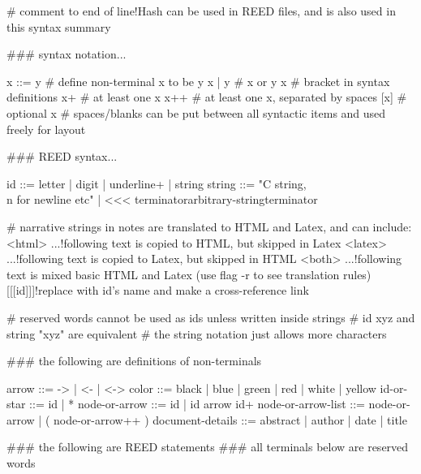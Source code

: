 # comment to end of line!Hash can be used in REED files, and is also used in this syntax summary

### syntax notation...

x ::= y # define non-terminal x to be y
x | y   # x or y
{x}     # bracket in syntax definitions
x+      # at least one x
x++     # at least one x, separated by spaces
[x]     # optional x
        # spaces/blanks can be put between all syntactic items and used freely for layout 

### REED syntax...

id ::= {letter | digit | underline}+ | string
string ::= "C string, \\n for newline etc" | <<< terminator\n                                                        arbitrary-string\n                                                terminator

# narrative strings in notes are translated to HTML and Latex, and can include:
<html> ...!following text is copied to HTML, but skipped in Latex
<latex> ...!following text is copied to Latex, but skipped in HTML
<both> ...!following text is mixed basic HTML and Latex (use flag -r to see translation rules)
[[[id]]]!replace with id's name and make a cross-reference link

# reserved words cannot be used as ids unless written inside strings
# id xyz and string "xyz" are equivalent
# the string notation just allows more characters

### the following are definitions of non-terminals

arrow ::= -> | <- | <->
color ::= black | blue | green | red | white | yellow
id-or-star ::= id | *
node-or-arrow ::= id | id {arrow id}+
node-or-arrow-list ::= node-or-arrow | ( node-or-arrow++ )
document-details ::= abstract | author | date | title

### the following are REED statements
### all terminals below are reserved words


